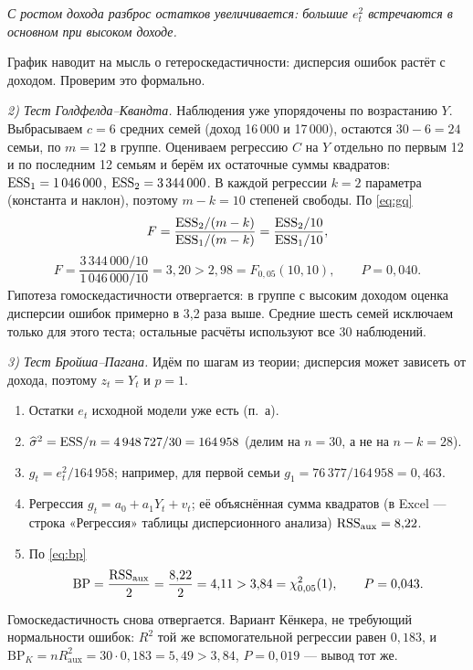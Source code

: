 \begin{solution}
\begin{minipage}{\linewidth}
\begin{center}
\smallskip
{\small\itshape С ростом дохода разброс остатков увеличивается: большие $e_t^2$
встречаются в основном при высоком доходе.\par}
\end{center}
\end{minipage}
График наводит на мысль о гетероскедастичности: дисперсия ошибок растёт
с доходом. Проверим это формально.

\smallskip
\emph{2) Тест Голдфелда--Квандта.} Наблюдения уже упорядочены по возрастанию
$Y$. Выбрасываем $c = 6$ средних семей (доход 16\,000 и 17\,000), остаются
$30 - 6 = 24$ семьи, по $m = 12$ в группе. Оцениваем регрессию $C$ на $Y$
отдельно по первым 12 и по последним 12 семьям и берём их остаточные суммы
квадратов: $\mathrm{ESS}_1 = 1\,046\,000$, $\mathrm{ESS}_2 = 3\,344\,000$. В каждой регрессии
$k = 2$ параметра (константа и наклон), поэтому $m - k = 10$ степеней
свободы. По \eqref{eq:gq}
\[
  F = \frac{\mathrm{ESS}_2/(m-k)}{\mathrm{ESS}_1/(m-k)} = \frac{\mathrm{ESS}_2/10}{\mathrm{ESS}_1/10},
\]
\[
  F = \frac{3\,344\,000/10}{1\,046\,000/10} = 3{,}20 > 2{,}98 = F_{0{,}05}(10, 10),
  \qquad P = 0{,}040 .
\]
Гипотеза гомоскедастичности отвергается: в группе с высоким доходом
оценка дисперсии ошибок примерно в 3,2 раза выше. Средние шесть семей
исключаем только для этого теста; остальные расчёты используют все 30
наблюдений.

\gqvisual

\smallskip
\emph{3) Тест Бройша--Пагана.} Идём по шагам из теории; дисперсия может
зависеть от дохода, поэтому $z_t = Y_t$ и $p = 1$.
\begin{enumerate}[label=\asbuk*), leftmargin=1.8em, itemsep=1pt]
  \item Остатки $e_t$ исходной модели уже есть (п.~а).
  \item $\widehat{\sigma}^2 = \mathrm{ESS}/n = 4\,948\,727/30 = 164\,958$ (делим на
        $n = 30$, а не на $n - k = 28$).
  \item $g_t = e_t^2/164\,958$; например, для первой семьи
        $g_1 = 76\,377/164\,958 = 0{,}463$.
  \item Регрессия $g_t = a_0 + a_1Y_t + v_t$; её объяснённая сумма квадратов
        (в Excel — строка «Регрессия» таблицы дисперсионного анализа)
        $\mathrm{RSS}_{\text{aux}} = 8{,}22$.
  \item По \eqref{eq:bp}
        \[
          \mathrm{BP} = \frac{\mathrm{RSS}_{\text{aux}}}{2} = \frac{8{,}22}{2} = 4{,}11
          > 3{,}84 = \chi^2_{0{,}05}(1),
          \qquad P = 0{,}043 .
        \]
\end{enumerate}
Гомоскедастичность снова отвергается. Вариант Кёнкера, не требующий
нормальности ошибок: $R^2$ той же вспомогательной регрессии равен $0{,}183$,
и $\mathrm{BP}_K = nR^2_{\text{aux}} = 30\cdot 0{,}183 = 5{,}49 > 3{,}84$,
$P = 0{,}019$ — вывод тот же.


\end{solution}
